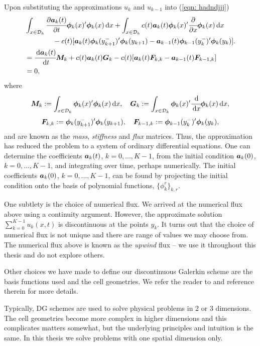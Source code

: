 Upon substituting the approximations \(u_k\) and \(u_{k-1}\) into (\ref{eqn: hadndjjj}) 
\begin{align}
	&\int_{x\in \mathcal{D}_k}\cfrac{\partial\boldsymbol a_k(t)}{\partial t}\boldsymbol \phi_k(x)'{}\boldsymbol\phi_k(x)\, \mathrm{d} x + \int_{x\in \mathcal{D}_k} c(t) \boldsymbol a_k(t)\boldsymbol\phi_k(x)'{}\cfrac{\partial}{\partial x} \boldsymbol \phi_k( x)\, \mathrm{d} x \nonumber
	\\&\qquad\qquad{}- c(t)[\boldsymbol a_k(t)\boldsymbol\phi_k(y_{k+1}^-)'{}\boldsymbol \phi_k(y_{k+1}) - \boldsymbol a_{k-1}(t)\boldsymbol\phi_{k-1}(y_{k}^-)'{}\boldsymbol \phi_k(y_{k})].\nonumber
	\\&=\cfrac{\, \mathrm{d} \boldsymbol a_k(t)}{\, \mathrm{d} t}\boldsymbol M_k + c(t) \boldsymbol a_k(t)\boldsymbol G_k - c(t)[\boldsymbol a_k(t)\boldsymbol F_{k,k} - \boldsymbol a_{k-1}(t)\boldsymbol F_{k-1,k}]\nonumber
	\\&= 0,\label{eqn: hadndj}
\end{align}
where 
\[\boldsymbol M_k := \int_{x\in\mathcal{D}_k}\boldsymbol \phi_k(x)'{}\boldsymbol \phi_k(x)\, \mathrm{d} x,\quad \boldsymbol G_k := \int_{x\in\mathcal{D}_k}\boldsymbol \phi_k(x)'{}\cfrac{\, \mathrm{d}}{\, \mathrm{d} x} \boldsymbol \phi_k(x)\, \mathrm{d} x,\]
\[\boldsymbol F_{k,k} := \boldsymbol\phi_k(y_{k+1}^-)'{}\boldsymbol \phi_k(y_{k+1}),\quad \boldsymbol F_{k-1,k} := \boldsymbol\phi_{k-1}(y_{k}^-)'{}\boldsymbol \phi_k(y_{k}),\]
and are known as the \emph{mass}, \emph{stiffness} and \emph{flux} matrices. Thus, the approximation has reduced the problem to a system of ordinary differential equations. One can determine the coefficients \(\boldsymbol a_k(t)\), \(k=0,...,K-1\), from the initial condition \(\boldsymbol a_k(0)\), \(k=0,...,K-1\), and integrating over time, perhaps numerically. The initial coefficients \(\boldsymbol a_k(0)\), \(k=0,...,K-1\), can be found by projecting the initial condition onto the basis of polynomial functions, \(\{\phi_k^r\}_{k,r}\). 

One subtlety is the choice of numerical flux. We arrived at the numerical flux above using a continuity argument. However, the approximate solution \(\sum_{k=0}^{K-1}u_k(x,t)\) is discontinuous at the points \({y_{k}}\). It turns out that the choice of numerical flux is not unique and there are range of values we may choose from. The numerical flux above is known as the \emph{upwind} flux -- we use it throughout this thesis and do not explore others. 

Other choices we have made to define our discontinuous Galerkin scheme are the basis functions used and the cell geometries. We refer the reader to \citep{nodalDGBook} and reference therein for more details. 

Typically, DG schemes are used to solve physical problems in 2 or 3 dimensions. The cell geometries become more complex in higher dimensions and this complicates matters somewhat, but the underlying principles and intuition is the same. In this thesis we solve problems with one spatial dimension only.

